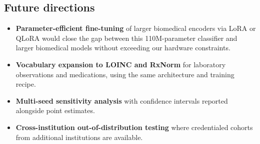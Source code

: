 \subsection{Future directions}\label{future-directions}

\begin{itemize}
\tightlist
\item
  \textbf{Parameter-efficient fine-tuning} of larger biomedical encoders
  via LoRA \autocite{Hu2022} or QLoRA \autocite{Dettmers2023} would close the gap
  between this 110M-parameter classifier and larger biomedical
  models without exceeding our hardware constraints.
\item
  \textbf{Vocabulary expansion to LOINC and RxNorm} for laboratory
  observations and medications, using the same architecture and
  training recipe.
\item
  \textbf{Multi-seed sensitivity analysis} with confidence intervals
  reported alongside point estimates.
\item
  \textbf{Cross-institution out-of-distribution testing} where
  credentialed cohorts from additional institutions are
  available.
\end{itemize}
